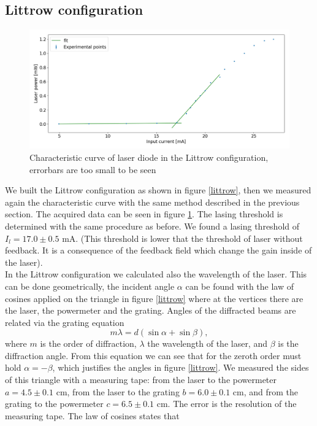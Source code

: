 \documentclass[a4paper,10pt]{article}
\begin{document}
\subsection{Littrow configuration}
\begin{figure}[H]
\centering
\includegraphics[width=\textwidth]{curvelittrow.png}
\caption{Characteristic curve of laser diode in the Littrow configuration, errorbars are too small to be seen}\label{littrowcurve}
\end{figure}
We built the Littrow configuration as shown in figure \ref{littrow}, then we measured again the characteristic curve with the same method described in the previous section. The acquired data can be seen in figure \ref{littrowcurve}. The lasing threshold is determined with the same procedure as before. We found a lasing threshold of $I_l =17.0 \pm 0.5$ mA. (This threshold is lower that the threshold of laser without feedback. It is a consequence of the feedback field which change the gain inside of the laser).\\
In the Littrow configuration we calculated also the wavelength of the laser. This can be done geometrically, the incident angle $\alpha$ can be found with the law of cosines applied on the triangle in figure \ref{littrow} where at the vertices there are the laser, the powermeter and the grating. Angles of the diffracted beams are related via the grating equation \cite{grating}
\begin{equation}\label{grating}m\lambda = d(\sin \alpha + \sin \beta),\end{equation}
where $m$ is the order of diffraction, $\lambda$ the wavelength of the laser, and $\beta$ is the diffraction angle. From this equation we can see that for the zeroth order must hold $\alpha = -\beta$, which justifies the angles in figure \ref{littrow}. We measured the sides of this triangle with a measuring tape: from the laser to the powermeter $a = 4.5 \pm 0.1$ cm, from the laser to the grating $b = 6.0\pm 0.1$ cm, and from the grating to the powermeter $c = 6.5\pm 0.1$ cm. The error is the resolution of the measuring tape. The law of cosines states that
\end{document}
